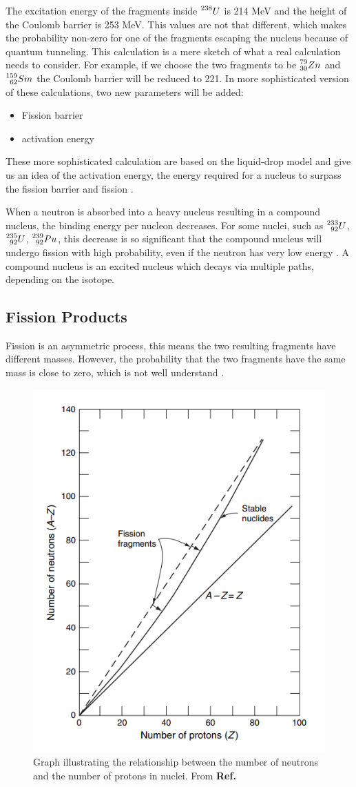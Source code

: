 The excitation energy of the fragments inside $\prescript{238}{}{U}$ is 214 MeV and the height of the Coulomb barrier is 253 MeV. This values are not that different, which  makes the probability non-zero for one of the fragments escaping the nucleus because of quantum tunneling. This calculation is a mere sketch  of what a real calculation needs to consider. For example, if we choose the two fragments to be $\prescript{79}{30}{Zn}$ and $\prescript{159}{62}{Sm}$ the Coulomb barrier will be reduced to 221. In more sophisticated version of these calculations, two new parameters will be added:

\begin{itemize}
    \item Fission barrier 
    \item activation energy
\end{itemize}

These more sophisticated calculation are based on the liquid-drop model and give us an idea of the activation energy, the energy required for a nucleus to surpass the fission barrier and fission \cite{Krane}.

When a neutron is absorbed into a heavy nucleus resulting in a compound nucleus, the binding energy per nucleon decreases. For some nuclei, such as $\prescript{233}{92}{U}$, $\prescript{235}{92}{U}$, $\prescript{239}{92}{Pu}$, this decrease is so significant that the compound nucleus will undergo fission with high probability, even if the neutron has very low energy \cite{Stacey_2010}. A compound nucleus is an excited nucleus which decays via multiple paths, depending on the isotope.

\subsection{Fission Products}
Fission is an asymmetric process, this means the two resulting fragments have different masses. However, the probability that the two fragments have the same mass is close to zero, which is not well understand \cite{Notas_sanabricas}. 

\begin{figure}[h]
    \centering
    \includegraphics[width=0.5\linewidth]{Kap2/Figures/stability_curve.png}
    \caption{Graph illustrating the relationship between the number of neutrons and the number of protons in nuclei. From \textbf{Ref.} \cite{Lewis_2014}}
    \label{fig:Stability_curve}
\end{figure}

